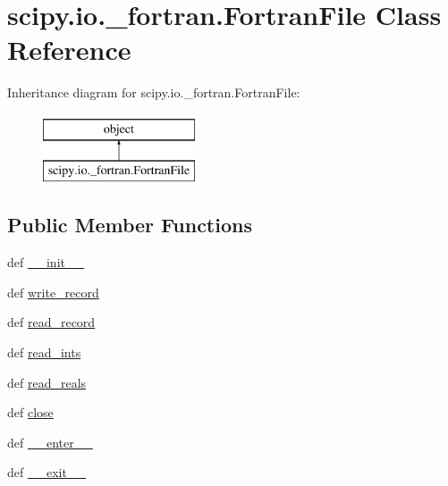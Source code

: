 \hypertarget{classscipy_1_1io_1_1__fortran_1_1FortranFile}{}\section{scipy.\+io.\+\_\+fortran.\+Fortran\+File Class Reference}
\label{classscipy_1_1io_1_1__fortran_1_1FortranFile}
Inheritance diagram for scipy.\+io.\+\_\+fortran.\+Fortran\+File\+:\begin{figure}[H]
\begin{center}
\leavevmode
\includegraphics[height=2.000000cm]{classscipy_1_1io_1_1__fortran_1_1FortranFile}
\end{center}
\end{figure}
\subsection*{Public Member Functions}
\begin{DoxyCompactItemize}
\item 
def \hyperlink{classscipy_1_1io_1_1__fortran_1_1FortranFile_a6b61b83803c0e081e63b679bd29a1225}{\+\_\+\+\_\+init\+\_\+\+\_\+}
\item 
def \hyperlink{classscipy_1_1io_1_1__fortran_1_1FortranFile_a9ab85cc3ddbf3e566af90f0aec0da42b}{write\+\_\+record}
\item 
def \hyperlink{classscipy_1_1io_1_1__fortran_1_1FortranFile_a2a79a8d2075e0c286dabea621319bcb6}{read\+\_\+record}
\item 
def \hyperlink{classscipy_1_1io_1_1__fortran_1_1FortranFile_a6fd42139c3347f139fa5e020b53c468b}{read\+\_\+ints}
\item 
def \hyperlink{classscipy_1_1io_1_1__fortran_1_1FortranFile_aac44ec3f84a3dfed1cced04a77d8e54e}{read\+\_\+reals}
\item 
def \hyperlink{classscipy_1_1io_1_1__fortran_1_1FortranFile_a9b1afc4070da3f96b3d03796e635d1b5}{close}
\item 
def \hyperlink{classscipy_1_1io_1_1__fortran_1_1FortranFile_a0c1d0427c50c87415720c3e239db4f7f}{\+\_\+\+\_\+enter\+\_\+\+\_\+}
\item 
def \hyperlink{classscipy_1_1io_1_1__fortran_1_1FortranFile_a562e1484c59c82776f3c3d18c9661116}{\+\_\+\+\_\+exit\+\_\+\+\_\+}
\end{DoxyCompactItemize}


